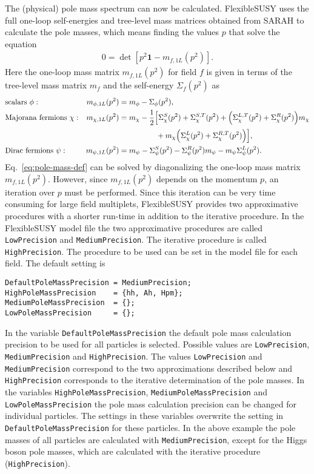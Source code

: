 \documentclass[final,3p,11pt,pdflatex]{elsarticle}
\makeatletter
\newcommand{\fs}{FlexibleSUSY\@\xspace}
\newcommand{\code}[1]{\lstinline|#1|}  %
\newcommand{\unity}{\mathbf{1}}
\makeatother
\begin{document}
The (physical) pole mass spectrum can now be calculated.  \fs uses the
full one-loop self-energies and tree-level mass matrices obtained from
SARAH to calculate the pole masses, which means finding the values $p$
that solve the equation
%
\begin{align}
  0 = \det\left[p^2\unity - m_{f,1L}(p^2)\right].
  \label{eq:pole-mass-def}
\end{align}
%
Here the one-loop mass matrix $m_{f,1L}(p^2)$ for field $f$ is given
in terms of the tree-level mass matrix $m_f$ and the self-energy
$\Sigma_f(p^2)$ as
%
\begin{align}
  &\text{scalars } \phi: &
  m_{\phi,1L}(p^2) &= m_{\phi} - \Sigma_\phi(p^2), \\
  &\text{Majorana fermions } \chi: &
  m_{\chi,1L}(p^2) &= m_{\chi} - \frac{1}{2}\Big[
    \Sigma_\chi^S(p^2) + \Sigma_\chi^{S,T}(p^2)
    + \Big( \Sigma_\chi^{L,T}(p^2) + \Sigma_\chi^R(p^2) \Big) m_{\chi} \notag \\
    &&&\phantom{= m_{\chi} - \frac{1}{2}\Big[}
    + m_{\chi} \Big( \Sigma_\chi^L(p^2) + \Sigma_\chi^{R,T}(p^2) \Big)
  \Big], \label{eq:majorana-loop-corrections} \\
  &\text{Dirac fermions } \psi: &
  m_{\psi,1L}(p^2) &= m_{\psi}
  - \Sigma_\psi^S(p^2)
  - \Sigma_\psi^R(p^2) m_{\psi}
  - m_{\psi} \Sigma_\psi^L(p^2) .
\end{align}
%
Eq.~\eqref{eq:pole-mass-def} can be solved by diagonalizing the
one-loop mass matrix $m_{f,1L}(p^2)$.  However, since $m_{f,1L}(p^2)$
depends on the momentum $p$, an iteration over $p$ must be performed.
Since this iteration can be very time consuming for large field
multiplets, \fs provides two approximative procedures with a shorter
run-time in addition to the iterative procedure.  In the \fs model
file the two approximative procedures are called \code{LowPrecision}
and \code{MediumPrecision}.  The iterative procedure is called
\code{HighPrecision}.  The procedure to be used can be set in the
model file for each field.  The default setting is
%
\begin{lstlisting}
DefaultPoleMassPrecision = MediumPrecision;
HighPoleMassPrecision    = {hh, Ah, Hpm};
MediumPoleMassPrecision  = {};
LowPoleMassPrecision     = {};
\end{lstlisting}
%
In the variable \code{DefaultPoleMassPrecision} the default pole mass
calculation precision to be used for all particles is selected.
Possible values are \code{LowPrecision}, \code{MediumPrecision} and
\code{HighPrecision}.  The values \code{LowPrecision} and
\code{MediumPrecision} correspond to the two approximations described
below and \code{HighPrecision} corresponds to the iterative
determination of the pole masses.  In the variables
\code{HighPoleMassPrecision}, \code{MediumPoleMassPrecision} and
\code{LowPoleMassPrecision} the pole mass calculation precision can be
changed for individual particles.  The settings in these variables
overwrite the setting in \code{DefaultPoleMassPrecision} for these
particles.  In the above example the pole masses of all particles are
calculated with \code{MediumPrecision}, except for the Higgs boson
pole masses, which are calculated with the iterative procedure
(\code{HighPrecision}).
\end{document}
